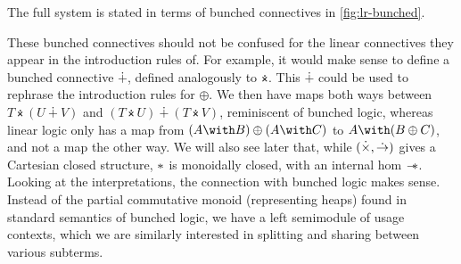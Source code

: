 The full system \name{} is stated in terms of bunched connectives in
\autoref{fig:lr-bunched}.

These bunched connectives should not be confused for the linear connectives
they appear in the introduction rules of.
For example, it would make sense to define a bunched connective $\dotplus$,
defined analogously to $\dottimes$.
This $\dotplus$ could be used to rephrase the introduction rules for $\oplus$.
We then have maps both ways between $T \dottimes (U \dotplus V)$ and
$(T \dottimes U) \dotplus (T \dottimes V)$, reminiscent of bunched logic,
whereas linear logic only has a map from $(A \with B) \oplus (A \with C)$ to
$A \with (B \oplus C)$, and not a map the other way.
We will also see later that, while $(\mathbin{\dot\times}, \mathrel{\dot\to})$ gives a Cartesian
closed structure, $\mathbin{*}$ is monoidally closed, with an internal hom $\mathrel{\mathord{-}\hspace{-0.75ex}*}$.
Looking at the interpretations, the connection with bunched logic makes sense.
Instead of the partial commutative monoid (representing heaps) found in
standard semantics of bunched logic, we have a left semimodule of usage
contexts, which we are similarly interested in splitting and sharing between
various subterms.

